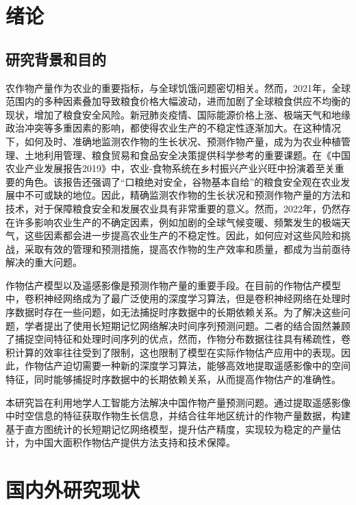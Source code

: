 \cleardoublepage

\section{绪论}

\subsection{研究背景和目的}
\par 农作物产量作为农业的重要指标，与全球饥饿问题密切相关。然而，2021年，全球范围内的多种因素叠加导致粮食价格大幅波动，进而加剧了全球粮食供应不均衡的现状，增加了粮食安全风险。新冠肺炎疫情、国际能源价格上涨、极端天气和地缘政治冲突等多重因素的影响，都使得农业生产的不稳定性逐渐加大。在这种情况下，如何及时、准确地监测农作物的生长状况、预测作物产量，成为为农业种植管理、土地利用管理、粮食贸易和食品安全决策提供科学参考的重要课题。在《中国农业产业发展报告2019》中，农业-食物系统在乡村振兴产业兴旺中扮演着至关重要的角色。该报告还强调了“口粮绝对安全，谷物基本自给”的粮食安全观在农业发展中不可或缺的地位。因此，精确监测农作物的生长状况和预测作物产量的方法和技术，对于保障粮食安全和发展农业具有非常重要的意义。然而，2022年，仍然存在许多影响农业生产的不确定因素，例如加剧的全球气候变暖、频繁发生的极端天气，这些因素都会进一步提高农业生产的不稳定性。因此，如何应对这些风险和挑战，采取有效的管理和预测措施，提高农作物的生产效率和质量，都成为当前亟待解决的重大问题。

\par 作物估产模型以及遥感影像是预测作物产量的重要手段。在目前的作物估产模型中，卷积神经网络成为了最广泛使用的深度学习算法，但是卷积神经网络在处理时序数据时存在一些问题，如无法捕捉时序数据中的长期依赖关系。为了解决这些问题，学者提出了使用长短期记忆网络解决时间序列预测问题。二者的结合固然兼顾了捕捉空间特征和处理时间序列的优点，然而，作物分布数据往往具有稀疏性，卷积计算的效率往往受到了限制，这也限制了模型在实际作物估产应用中的表现。因此，作物估产迫切需要一种新的深度学习算法，能够高效地提取遥感影像中的空间特征，同时能够捕捉时序数据中的长期依赖关系，从而提高作物估产的准确性。

\par 本研究旨在利用地学人工智能方法解决中国作物产量预测问题。通过提取遥感影像中时空信息的特征获取作物生长信息，并结合往年地区统计的作物产量数据，构建基于直方图统计的长短期记忆网络模型，提升估产精度，实现较为稳定的产量估计，为中国大面积作物估产提供方法支持和技术保障。

\section{国内外研究现状}

